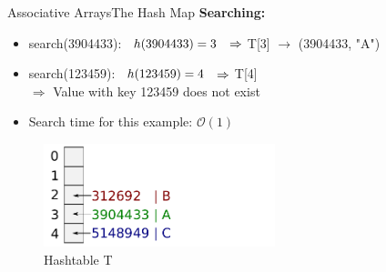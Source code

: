 
\begin{frame}{Associative Arrays}{The Hash Map}
  \textbf{Searching:}
  \small
  \begin{itemize}
     \setlength\itemsep{0.75em}
    \item<1->
    search(3904433):
      $\hspace*{0.5em} h(3904433) = 3$
      $\hspace*{0.5em} \Rightarrow$
      T[3] $\rightarrow$ {\color{inkscapeGreen}(3904433, "A")}
    \item<2->
      search(123459):
      $\hspace*{0.5em} h(123459) = 4$
      $\hspace*{0.5em} \Rightarrow$
      T[4] {}\\
      \vspace{0.75em}
      $\Rightarrow$ {\color{red}Value with key 123459 does not exist}
    \item<3->
      Search time for this example: {\color{Mittel-Blau}$\mathcal{O}(1)$}
  \end{itemize}
  \vspace*{-1.0em}
  \begin{figure}
    \caption{Hashtable T}
    \centering
    \includegraphics[width=0.6\textwidth]{Images/Bucket4.pdf}
  \end{figure}
\end{frame}


